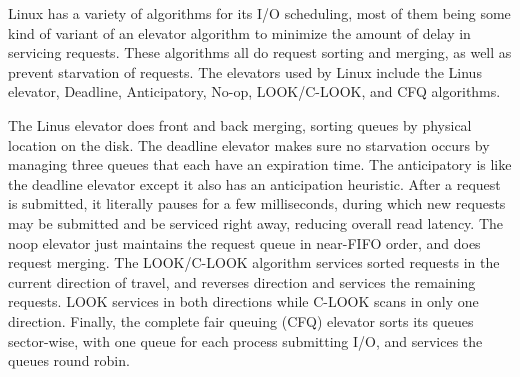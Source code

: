 \documentclass[10pt,draftclsnofoot,onecolumn,letterpaper]{IEEEtran}
\begin{document}
Linux has a variety of algorithms for its I/O scheduling, most of them being some kind of variant of an elevator algorithm to minimize the amount of delay in servicing requests. These algorithms all do request sorting and merging, as well as prevent starvation of requests\cite{1}. The elevators used by Linux include the Linus elevator, Deadline, Anticipatory, No-op, LOOK/C-LOOK, and CFQ algorithms. \par
The Linus elevator does front and back merging, sorting queues by physical location on the disk. The deadline elevator makes sure no starvation occurs by managing three queues that each have an expiration time. The anticipatory is like the deadline elevator except it also has an anticipation heuristic. After a request is submitted, it literally pauses for a few milliseconds, during which new requests may be submitted and be serviced right away, reducing overall read latency\cite{8}. The noop elevator just maintains the request queue in near-FIFO order, and does request merging. The LOOK/C-LOOK algorithm services sorted requests in the current direction of travel, and reverses direction and services the remaining requests. LOOK services in both directions while C-LOOK scans in only one direction. Finally, the complete fair queuing (CFQ) elevator sorts its queues sector-wise, with one queue for each process submitting I/O, and services the queues round robin\cite{8}. \par

\vspace{5mm}
\end{document}
